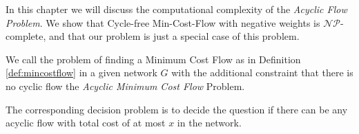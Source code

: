 In this chapter we will discuss the computational complexity of the \textit{Acyclic Flow Problem}. We show that 
Cycle-free Min-Cost-Flow with negative weights is $\mathcal{NP}$-complete, and that our problem is just a special case 
of this problem. 


\begin{definition}
 We call the problem of finding a Minimum Cost Flow as in Definition \ref{def:mincostflow} in a given 
network $G$ with the additional constraint  that there is no cyclic flow the \textit{Acyclic Minimum Cost Flow} 
Problem. 

The corresponding decision problem is to decide the question if there can be any acyclic flow with total cost of at 
most $x$ in the network.%
\end{definition}

